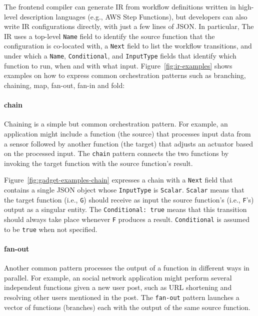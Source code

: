 The \name{} frontend compiler can generate IR from workflow definitions
written in high-level description languages (e.g., AWS Step Functions), but
developers can also write IR configurations directly, with just a few lines of
JSON. In particular, The \name{} IR uses a top-level \texttt{Name} field to
identify the source function that the configuration is co-located with, a
\texttt{Next} field to list the workflow transitions, and under which a
\texttt{Name}, \texttt{Conditional}, and \texttt{InputType} fields that
identify which function to run, when and with what input.
Figure~\ref{fig:ir-examples} shows examples on how to express common
orchestration patterns such as branching, chaining, map, fan-out, fan-in and
fold:


\paragraph{chain}

Chaining is a simple but common orchestration pattern. For example, an
application might include a function (the source) that processes input data
from a sensor followed by another function (the target) that adjusts an
actuator based on the processed input. The \texttt{chain} pattern connects the
two functions by invoking the target function with the source function's
result.

Figure~\ref{fig:gadget-examples-chain} expresses a chain with a \texttt{Next}
field that contains a single JSON object whose \texttt{InputType} is
\texttt{Scalar}. \texttt{Scalar} means that the target function (i.e.,
\texttt{G}) should receive as input the source function's (i.e., \texttt{F}'s)
output as a singular entity. The \texttt{Conditional: true} means that this
transition should always take place whenever \texttt{F} produces a result.
\texttt{Conditional} is assumed to be \texttt{true} when not specified.

\paragraph{fan-out}

Another common pattern processes the output of a function in different ways in
parallel. For example, an social network application might perform several
independent functions given a new user post, such as URL shortening and
resolving other users mentioned in the post. The \texttt{fan-out} pattern
launches a vector of functions (branches) each with the output of the same
source function.

